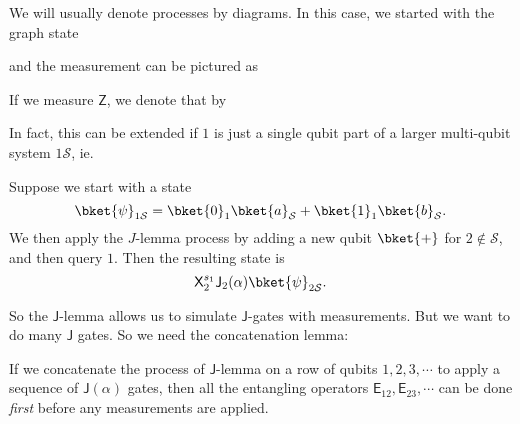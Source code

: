 \documentclass[a4paper]{article}
\newcommand{\qE}{\mathsf{E}}
\newcommand{\qJ}{\mathsf{J}}
\newcommand{\qX}{\mathsf{X}}
\newcommand{\qZ}{\mathsf{Z}}
\begin{document}
We will usually denote processes by diagrams. In this case, we started with the graph state
\begin{center}
\end{center}
and the measurement can be pictured as
\begin{center}
\end{center}
If we measure $\qZ$, we denote that by
\begin{center}
\end{center}
In fact, this can be extended if $1$ is just a single qubit part of a larger multi-qubit system $1\mathcal{S}$, ie.
\begin{lemma}
  Suppose we start with a state
  \[
    \bket{\psi}_{1\mathcal{S}} = \bket{0}_1\bket{a}_\mathcal{S} + \bket{1}_1 \bket{b}_\mathcal{S}.
  \]
  We then apply the $J$-lemma process by adding a new qubit $\bket{+}$ for $2 \not \in \mathcal{S}$, and then query $1$. Then the resulting state is
  \[
    \qX_2^{s_1}\qJ_2(\alpha) \bket{\psi}_{2\mathcal{S}}.
  \]
\end{lemma}
So the $\qJ$-lemma allows us to simulate $\qJ$-gates with measurements. But we want to do many $\qJ$ gates. So we need the concatenation lemma:
\begin{lemma}
  If we concatenate the process of $\qJ$-lemma on a row of qubits $1, 2, 3, \cdots$ to apply a sequence of $\qJ(\alpha)$ gates, then all the entangling operators $\qE_{12}, \qE_{23}, \cdots$ can be done \emph{first} before any measurements are applied.
\end{lemma}
\end{document}
